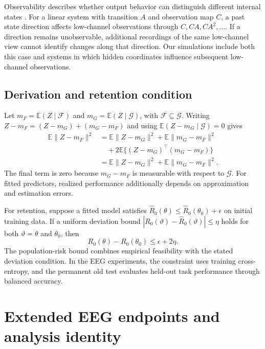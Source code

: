 \documentclass[11pt,a4paper]{article}
\newcommand{\E}{\mathbb{E}}
\begin{document}
Observability describes whether output behavior can distinguish different internal states \cite{hermann1977}. For a linear system with transition $A$ and observation map $C$, a past state direction affects low-channel observations through $C,CA,CA^2,\ldots$. If a direction remains unobservable, additional recordings of the same low-channel view cannot identify changes along that direction. Our simulations include both this case and systems in which hidden coordinates influence subsequent low-channel observations.

\subsection{Derivation and retention condition}

Let $m_F=\E(Z\mid\mathcal F)$ and $m_G=\E(Z\mid\mathcal G)$, with $\mathcal F\subseteq\mathcal G$. Writing $Z-m_F=(Z-m_G)+(m_G-m_F)$ and using $\E(Z-m_G\mid\mathcal G)=0$ gives
\begin{align*}
 \E\|Z-m_F\|^2
 &=\E\|Z-m_G\|^2+\E\|m_G-m_F\|^2\\
 &\quad+2\E\{(Z-m_G)^\top(m_G-m_F)\}\\
 &=\E\|Z-m_G\|^2+\E\|m_G-m_F\|^2.
\end{align*}
The final term is zero because $m_G-m_F$ is measurable with respect to $\mathcal G$. For fitted predictors, realized performance additionally depends on approximation and estimation errors.

For retention, suppose a fitted model satisfies $\widehat R_0(\theta)\leq\widehat R_0(\theta_0)+\epsilon$ on initial training data. If a uniform deviation bound $|R_0(\vartheta)-\widehat R_0(\vartheta)|\leq\eta$ holds for both $\vartheta=\theta$ and $\theta_0$, then
\begin{equation}
 R_0(\theta)-R_0(\theta_0)\leq\epsilon+2\eta.
\end{equation}
The population-risk bound combines empirical feasibility with the stated deviation condition. In the EEG experiments, the constraint uses training cross-entropy, and the permanent old test evaluates held-out task performance through balanced accuracy.

\section{Extended EEG endpoints and analysis identity}
\label{app:eeg}
\end{document}
